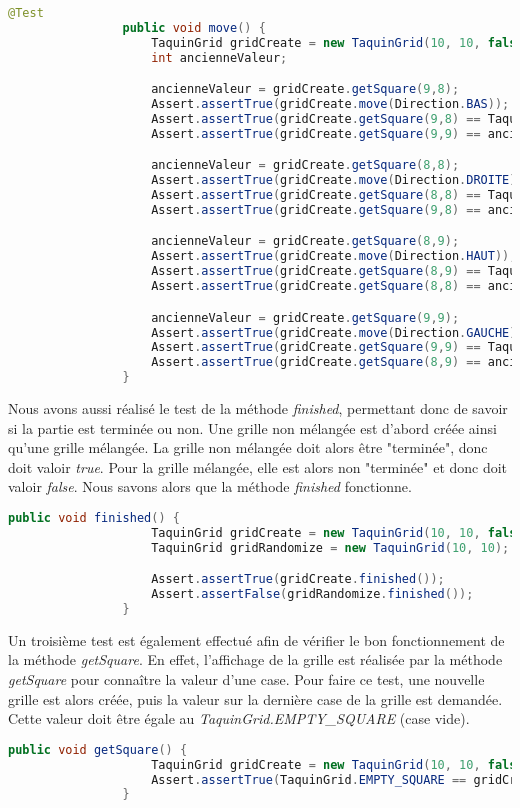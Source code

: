 			\begin{lstlisting}[gobble=12, caption=Test Moved(), language=java, label=TestMoved]
				@Test
				public void move() {
					TaquinGrid gridCreate = new TaquinGrid(10, 10, false);
					int ancienneValeur;

					ancienneValeur = gridCreate.getSquare(9,8);
					Assert.assertTrue(gridCreate.move(Direction.BAS));
					Assert.assertTrue(gridCreate.getSquare(9,8) == TaquinGrid.EMPTY_SQUARE);
					Assert.assertTrue(gridCreate.getSquare(9,9) == ancienneValeur);

					ancienneValeur = gridCreate.getSquare(8,8);
					Assert.assertTrue(gridCreate.move(Direction.DROITE));
					Assert.assertTrue(gridCreate.getSquare(8,8) == TaquinGrid.EMPTY_SQUARE);
					Assert.assertTrue(gridCreate.getSquare(9,8) == ancienneValeur);

					ancienneValeur = gridCreate.getSquare(8,9);
					Assert.assertTrue(gridCreate.move(Direction.HAUT));
					Assert.assertTrue(gridCreate.getSquare(8,9) == TaquinGrid.EMPTY_SQUARE);
					Assert.assertTrue(gridCreate.getSquare(8,8) == ancienneValeur);

					ancienneValeur = gridCreate.getSquare(9,9);
					Assert.assertTrue(gridCreate.move(Direction.GAUCHE));
					Assert.assertTrue(gridCreate.getSquare(9,9) == TaquinGrid.EMPTY_SQUARE);
					Assert.assertTrue(gridCreate.getSquare(8,9) == ancienneValeur);
				}
			\end{lstlisting}

			Nous avons aussi réalisé le test de la méthode \textit{finished}, permettant donc de savoir si la partie est terminée ou non. Une grille non mélangée est d'abord créée ainsi qu'une grille mélangée. La grille non mélangée doit alors être "terminée", donc doit valoir \textit{true}. Pour la grille mélangée, elle est alors non "terminée" et donc doit valoir \textit{false}. Nous savons alors que la méthode \textit{finished} fonctionne.

			\begin{lstlisting}[gobble=12, language=java, caption=Teste de la méthode finished()]
				public void finished() {
					TaquinGrid gridCreate = new TaquinGrid(10, 10, false);
					TaquinGrid gridRandomize = new TaquinGrid(10, 10);

					Assert.assertTrue(gridCreate.finished());
					Assert.assertFalse(gridRandomize.finished());
				}
			\end{lstlisting}

			Un troisième test est également effectué afin de vérifier le bon fonctionnement de la méthode \textit{getSquare}. En effet, l'affichage de la grille est réalisée par la méthode \textit{getSquare} pour connaître la valeur d'une case. Pour faire ce test, une nouvelle grille est alors créée, puis la valeur sur la dernière case de la grille est demandée. Cette valeur doit être égale au \textit{TaquinGrid.EMPTY\_SQUARE} (case vide).

			\begin{lstlisting}[gobble=12, language=java, caption=Teste getSquare()]
				public void getSquare() {
					TaquinGrid gridCreate = new TaquinGrid(10, 10, false);
					Assert.assertTrue(TaquinGrid.EMPTY_SQUARE == gridCreate.getSquare(9, 9));
				}
			\end{lstlisting}
